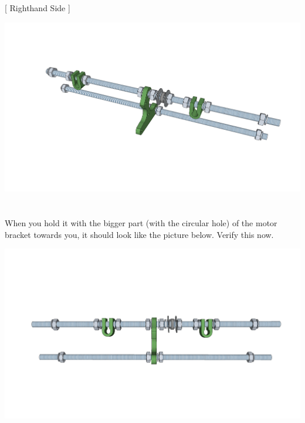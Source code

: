 \documentclass[twoside,openany,a4paper,titlepage]{memoir}
\begin{document}
	[ Righthand Side ]
	\begin{center}
		\includegraphics[width=1\linewidth]{graphics/ch2_5_5.png}
	\end{center}
	
	\section{}
	When you hold it with the bigger part (with the circular hole) of the motor bracket towards you, it should
	look like the picture below. Verify this now.\\
	\begin{center}
		\includegraphics[width=1\linewidth]{graphics/ch2_6.png}
	\end{center}
	
\end{document}
